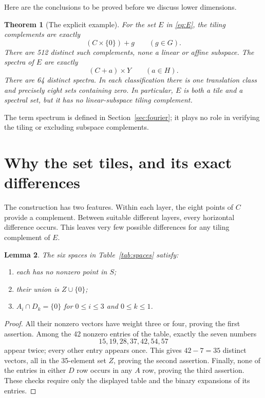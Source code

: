 \documentclass[11pt]{article}
\numberwithin{equation}{section}
\newtheorem{theorem}{Theorem}[section]
\newtheorem{lemma}[theorem]{Lemma}
\theoremstyle{definition}
\theoremstyle{remark}\newtheorem{remark}[theorem]{Remark}
\begin{document}
Here are the conclusions to be proved before we discuss lower dimensions.
\begin{theorem}[The explicit example]\label{thm:example}
For the set $E$ in \eqref{eq:E}, the tiling complements are exactly
\[
 (C\times\{0\})+g\qquad(g\in G).
\]
There are 512 distinct such complements, none a linear or affine subspace. The spectra of $E$ are exactly
\[
 (C+a)\times Y\qquad(a\in H).
\]
There are 64 distinct spectra. In each classification there is one translation class and precisely eight sets containing zero. In particular, $E$ is both a tile and a spectral set, but it has no linear-subspace tiling complement.
\end{theorem}
The term spectrum is defined in Section~\ref{sec:fourier}; it plays no role in verifying the tiling or excluding subspace complements.

\section{Why the set tiles, and its exact differences}\label{sec:differences}
The construction has two features. Within each layer, the eight points of $C$ provide a complement. Between suitable different layers, every horizontal difference occurs. This leaves very few possible differences for any tiling complement of $E$.

\begin{lemma}\label{lem:table}
The six spaces in Table~\ref{tab:spaces} satisfy:
\begin{enumerate}
\item each has no nonzero point in $S$;
\item their union is $Z\cup\{0\}$;
\item $A_i\cap D_k=\{0\}$ for $0\le i\le3$ and $0\le k\le1$.
\end{enumerate}
\end{lemma}
\begin{proof}
All their nonzero vectors have weight three or four, proving the first assertion. Among the 42 nonzero entries of the table, exactly the seven numbers
\[
 15,19,28,37,42,54,57
\]
appear twice; every other entry appears once. This gives $42-7=35$ distinct vectors, all in the 35-element set $Z$, proving the second assertion. Finally, none of the entries in either $D$ row occurs in any $A$ row, proving the third assertion. These checks require only the displayed table and the binary expansions of its entries.
\end{proof}
\end{document}
